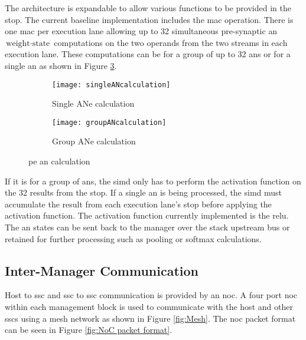 The architecture is expandable to allow various functions to be provided in the \ac{stop}.
The current baseline implementation includes the \ac{mac} operation.
There is one \ac{mac} per execution lane allowing up to 32 simultaneous pre-synaptic \ac{an} $\mbox{weight} \cdot \mbox{state}$ computations on the two operands from the two streams in each execution lane.
These computations can be for a group of up to 32 \acp{an} or for a single \ac{an} as shown in Figure \ref{fig:PE AN calculation}.

\begin{figure}
\centering
  \begin{subfigure}{.49\textwidth}
    \centering
    \texttt{[image: singleANcalculation]}
    \captionsetup{justification=centering, skip=10pt}
    \caption{Single ANe calculation}
    \label{fig:Single AN calculation}
  \end{subfigure}%
  \begin{subfigure}{.49\textwidth}
    \centering
    \texttt{[image: groupANcalculation]}
    \captionsetup{justification=centering, skip=10pt}
    \caption{Group ANe calculation}
    \label{fig:Group AN calculation}
  \end{subfigure}%
\captionsetup{justification=centering, skip=16pt}
\caption{\ac{pe} \ac{an} calculation}
\label{fig:PE AN calculation}
\end{figure}

If it is for a group of \acp{an}, the \ac{simd} only has to perform the activation function on the 32 results from the \ac{stop}. 
If a single \ac{an} is being processed, the \ac{simd} must accumulate the result from each execution lane's \ac{stop} before applying the activation function.
The activation function currently implemented is the \ac{relu}.
The \ac{an} states can be sent back to the manager over the stack upstream bus or retained for further processing such as pooling or softmax calculations.

\subsection{Inter-Manager Communication}
\label{sec:Inter-Manager Communication}

Host to \ac{ssc} and \ac{ssc} to \ac{ssc} communication is provided by an \ac{noc}.
A four port \ac{noc} within each management block is used to communicate with the host and other \acp{ssc} using a mesh network as shown in Figure \ref{fig:Mesh}.
The \ac{noc} packet format can be seen in Figure \ref{fig:NoC packet format}.

